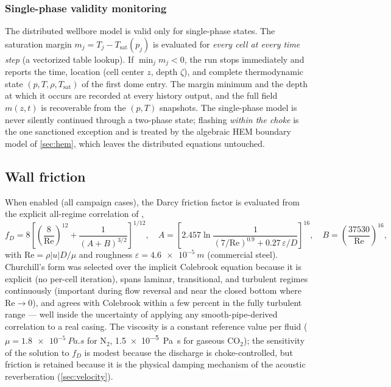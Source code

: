 \documentclass[11pt]{article}
\newcommand{\co}{CO$_2$}
\begin{document}
\subsubsection{Single-phase validity monitoring}
\label{sec:monitor}

The distributed wellbore model is valid only for single-phase states.
The saturation margin $m_j = T_j - T_{\mathrm{sat}}(p_j)$ is evaluated
for \emph{every cell at every time step} (a vectorized table lookup).
If $\min_j m_j < 0$, the run stops immediately and reports the time,
location (cell center $z$, depth $\zeta$), and complete thermodynamic
state $(p, T, \rho, T_{\mathrm{sat}})$ of the first dome entry. The
margin minimum and the depth at which it occurs are recorded at every
history output, and the full field $m(z,t)$ is recoverable from the
$(p,T)$ snapshots. The single-phase model is never silently continued
through a two-phase state; flashing \emph{within the choke} is the one
sanctioned exception and is treated by the algebraic HEM boundary model
of \cref{sec:hem}, which leaves the distributed equations untouched.

\subsection{Wall friction}
\label{sec:friction}

When enabled (all campaign cases), the Darcy friction factor is
evaluated from the explicit all-regime correlation of
\citet{churchill1977},
\begin{equation}
f_D = 8\left[\left(\frac{8}{\mathrm{Re}}\right)^{12}
+ \frac{1}{(A+B)^{3/2}}\right]^{1/12},\quad
A = \left[2.457\ln\!\frac{1}{(7/\mathrm{Re})^{0.9}
+ 0.27\,\varepsilon/D}\right]^{16},\quad
B = \left(\frac{37530}{\mathrm{Re}}\right)^{16},
\label{eq:churchill}
\end{equation}
with $\mathrm{Re} = \rho |u| D/\mu$ and roughness
$\varepsilon = \SI{4.6e-5}{m}$ (commercial steel). Churchill's form was
selected over the implicit Colebrook equation because it is explicit
(no per-cell iteration), spans laminar, transitional, and turbulent
regimes continuously (important during flow reversal and near the
closed bottom where $\mathrm{Re}\to0$), and agrees with Colebrook
within a few percent in the fully turbulent range --- well inside the
uncertainty of applying any smooth-pipe-derived correlation to a real
casing. The viscosity is a constant reference value per fluid
($\mu = \SI{1.8e-5}{Pa.s}$ for N$_2$, \SI{1.5e-5}{Pa.s} for gaseous
\co); the sensitivity of the solution to $f_D$ is modest because the
discharge is choke-controlled, but friction is retained because it is
the physical damping mechanism of the acoustic reverberation
(\cref{sec:velocity}).
\end{document}
